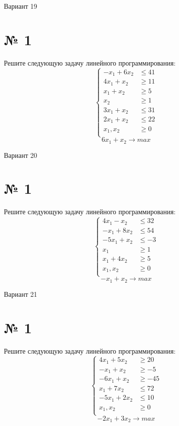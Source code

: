 \documentclass{article}%
\begin{document}
%
\newpage%
\begin{center}%
\begin{Huge}%
Вариант 19%
\end{Huge}%
\end{center}%
\section*{№ 1}%
\label{sec:1}%
Решите следующую задачу линейного программирования: %
\[%
\left\{\begin{aligned}-x_{1}+6x_{2} & \le41 \\4x_{1}+x_{2} & \ge11 \\x_{1}+x_{2} & \ge5 \\x_{2} & \ge1 \\3x_{1}+x_{2} & \le31 \\2x_{1}+x_{2} & \le22 \\x_{1},x_{2} & \ge 0 \\\end{aligned}\right.%
\]%
\[%
6x_{1}+x_{2}  \to max%
\]

%
\newpage%
\begin{center}%
\begin{Huge}%
Вариант 20%
\end{Huge}%
\end{center}%
\section*{№ 1}%
\label{sec:1}%
Решите следующую задачу линейного программирования: %
\[%
\left\{\begin{aligned}4x_{1}-x_{2} & \le32 \\-x_{1}+8x_{2} & \le54 \\-5x_{1}+x_{2} & \le-3 \\x_{1} & \ge1 \\x_{1}+4x_{2} & \ge5 \\x_{1},x_{2} & \ge 0 \\\end{aligned}\right.%
\]%
\[%
-x_{1}+x_{2}  \to max%
\]

%
\newpage%
\begin{center}%
\begin{Huge}%
Вариант 21%
\end{Huge}%
\end{center}%
\section*{№ 1}%
\label{sec:1}%
Решите следующую задачу линейного программирования: %
\[%
\left\{\begin{aligned}4x_{1}+5x_{2} & \ge20 \\-x_{1}+x_{2} & \ge-5 \\-6x_{1}+x_{2} & \ge-45 \\x_{1}+7x_{2} & \le72 \\-5x_{1}+2x_{2} & \le10 \\x_{1},x_{2} & \ge 0 \\\end{aligned}\right.%
\]%
\[%
-2x_{1}+3x_{2}  \to max%
\]
\end{document}
